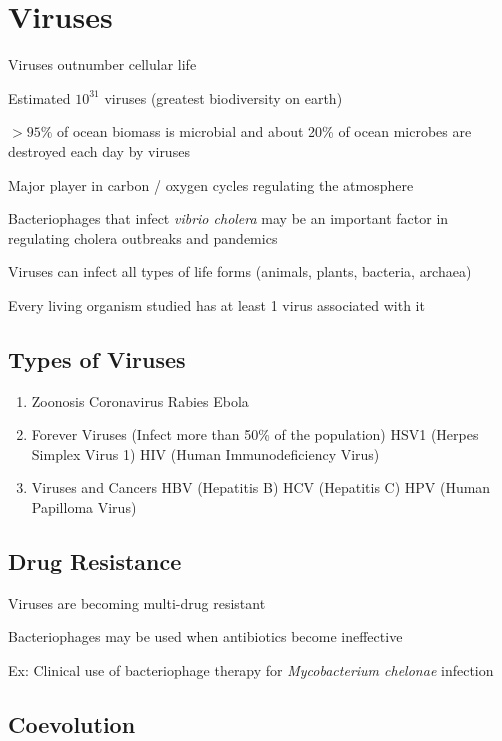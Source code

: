 \documentclass{notes}
\begin{document}
\section{Viruses}

Viruses outnumber cellular life

Estimated \(10^{31}\) viruses (greatest biodiversity on earth)

\(>95\%\) of ocean biomass is microbial and about 20\% of ocean microbes are destroyed each day by viruses

\tab \indicates Major player in carbon / oxygen cycles regulating the atmosphere

Bacteriophages that infect \textit{vibrio cholera} may be an important factor in regulating cholera outbreaks and pandemics

Viruses can infect all types of life forms (animals, plants, bacteria, archaea)

\tab \indicates Every living organism studied has at least 1 virus associated with it

\subsection{Types of Viruses}

\begin{enumerate}
    \item Zoonosis
    \subitem Coronavirus
    \subitem Rabies
    \subitem Ebola
    \item Forever Viruses (Infect more than 50\% of the population)
    \subitem HSV1 (Herpes Simplex Virus 1)
    \subitem HIV (Human Immunodeficiency Virus)
    \item Viruses and Cancers
    \subitem HBV (Hepatitis B)
    \subitem HCV (Hepatitis C)
    \subitem HPV (Human Papilloma Virus)
\end{enumerate}

\subsection{Drug Resistance}

Viruses are becoming multi-drug resistant

\tab \indicates Bacteriophages may be used when antibiotics become ineffective

Ex: Clinical use of bacteriophage therapy for \textit{Mycobacterium chelonae} infection

\subsection{Coevolution}
\end{document}
